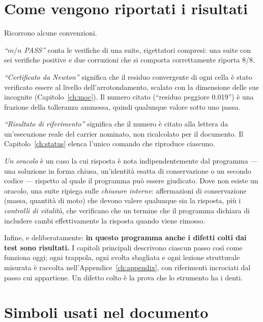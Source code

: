\section{Come vengono riportati i risultati}

Ricorrono alcune convenzioni.

\emph{``$m/n$ PASS''} conta le verifiche di una suite, rigettatori
compresi: una suite con sei verifiche positive e due corruzioni che
si comporta correttamente riporta 8/8.

\emph{``Certificato da Newton''} significa che il residuo convergente
di ogni cella è stato verificato essere al livello
dell'arrotondamento, scalato con la dimensione delle sue incognite
(Capitolo~\ref{ch:moc}). Il numero citato (``residuo peggiore
0.019'') è una frazione della tolleranza ammessa, quindi qualunque
valore sotto uno passa.

\emph{``Risultato di riferimento''} significa che il numero è citato
alla lettera da un'esecuzione reale del carrier nominato, non
ricalcolato per il documento. Il Capitolo~\ref{ch:status} elenca
l'unico comando che riproduce ciascuno.

\emph{Un oracolo} è un caso la cui risposta è nota indipendentemente
dal programma --- una soluzione in forma chiusa, un'identità esatta
di conservazione o un secondo codice --- rispetto al quale il
programma può essere giudicato. Dove non esiste un oracolo, una
suite ripiega sulle \emph{chiusure interne}: affermazioni di
conservazione (massa, quantità di moto) che devono valere qualunque
sia la risposta, più i \emph{controlli di vitalità}, che verificano
che un termine che il programma dichiara di includere cambi
effettivamente la risposta quando viene rimosso.

Infine, e deliberatamente: \textbf{in questo programma anche i
difetti colti dai test sono risultati.} I capitoli principali
descrivono ciascun passo così come funziona oggi; ogni trappola,
ogni svolta sbagliata e ogni lezione strutturale misurata è raccolta
nell'Appendice~\ref{ch:appendix}, con riferimenti incrociati dal
passo cui appartiene. Un difetto colto è la prova che lo strumento
ha i denti.

\section{Simboli usati nel documento}

